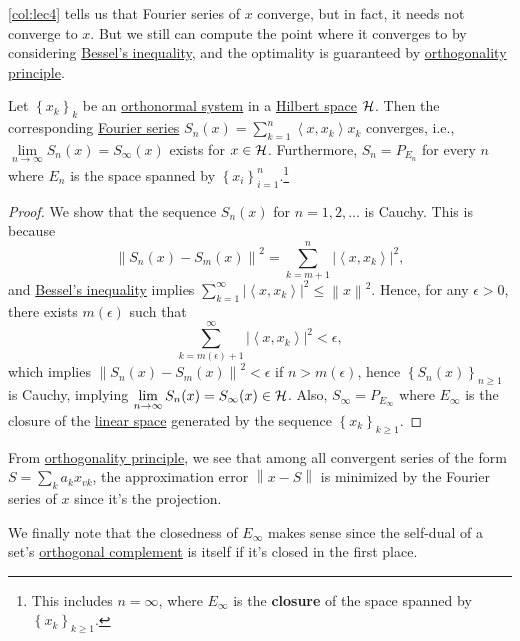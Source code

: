 \autoref{col:lec4} tells us that Fourier series of \(x\) converge, but in fact, it needs not converge to \(x\). But we still can compute the point where it converges to by considering \hyperref[thm:Bessel-ineq]{Bessel's inequality}, and the optimality is guaranteed by \hyperref[thm:orthogonality-principle]{orthogonality principle}.

\begin{theorem}
	Let \(\left\{ x_{k}\right\}_{k} \) be an \hyperref[def:orthonormal-system]{orthonormal system} in a \hyperref[def:Hilbert-space]{Hilbert space} \(\mathcal{\MakeUppercase{h}} \). Then the corresponding \hyperref[def:Fourier-series]{Fourier series} \(S_n(x) = \sum_{k=1}^{n} \left\langle  x, x_{k} \right\rangle  x_{k}\) converges, i.e., \(\lim\limits_{n \to \infty} S_{n} (x) = S_{\infty }(x)\) exists for \(x\in \mathcal{\MakeUppercase{h}} \). Furthermore, \(S_n = P_{E_n}\) for every \(n\) where \(E_n\) is the space spanned by \(\left\{ x_i \right\} _{i=1}^n\).\footnote{This includes \(n=\infty\), where \(E_\infty \) is the \textbf{closure} of the space spanned by \(\left\{ x_k \right\}_{k\geq 1} \).}
\end{theorem}
\begin{proof}
	We show that the sequence \(S_n(x)\) for \(n = 1, 2, \ldots\) is Cauchy. This is because
	\[
		\left\lVert S_n(x) - S_m(x)\right\rVert ^{2} = \sum_{k=m+1}^{n} \left\vert \left\langle x, x_{k}\right\rangle  \right\vert ^{2},
	\]
	and \hyperref[thm:Bessel-ineq]{Bessel's inequality} implies \(\sum_{k=1}^{\infty} \left\vert \left\langle x, x_{k}  \right\rangle  \right\vert ^{2} \leq \left\lVert x\right\rVert ^{2} \). Hence, for any \(\epsilon > 0\), there exists \(m(\epsilon )\) such that
	\[
		\sum_{k=m(\epsilon )+1}^{\infty} \left\vert \left\langle x, x_{k}  \right\rangle  \right\vert ^{2} < \epsilon,
	\]
	which implies \(\left\lVert S_n(x) - S_m(x)\right\rVert ^{2} < \epsilon \) if \(n > m(\epsilon )\), hence \(\left\{ S_{n} (x) \right\}_{n\geq 1}\) is Cauchy, implying \(\lim\limits_{n \to \infty} S_n(x)= S_\infty (x)\in \mathcal{\MakeUppercase{h}} \). Also, \(S_\infty = P_{E_\infty }\) where \(E_\infty \) is the closure of the \hyperref[def:linear-vector-space]{linear space} generated by the sequence \(\left\{ x_{k} \right\}_{k \geq 1}\).
\end{proof}

\begin{remark}
	From \hyperref[thm:orthogonality-principle]{orthogonality principle}, we see that among all convergent series of the form \(S = \sum_{k} a_k x_{vk} \), the approximation error \(\left\lVert x - S\right\rVert \) is minimized by the Fourier series of \(x\) since it's the projection.
\end{remark}

We finally note that the closedness of \(E_\infty \) makes sense since the self-dual of a set's \hyperref[def:orthogonal-complement]{orthogonal complement} is itself if it's closed in the first place.